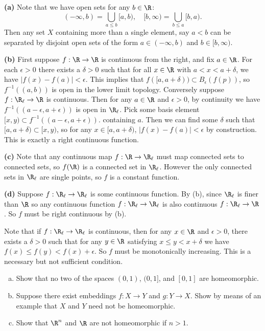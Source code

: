 \documentclass[11pt,letterpaper]{article}
\begin{document}
\begin{solution}
    \textbf{(a)} Note that we have open sets for any $b\in \R$: 
    \[
        (-\infty, b)=\bigcup_{a\leq b}[a,b),\quad [b,\infty)=\bigcup_{b\leq a}[b,a)
    .\] 
    Then any set $X$ containing more than a single element, say $a< b$ can be separated by disjoint open sets of the form $a\in(-\infty,b)$ and $b\in [b,\infty)$.
    
    \textbf{(b)} First suppose $f : \R \to \R$ is continuous from the right, and fix $a\in \R$. For each $\epsilon>0$ there exists a $\delta> 0$ such that for all $x\in \R$ with $a < x < a+\delta$, we have $|f(x)-f(a)|< \epsilon$. This implies that $f([a, a+\delta)) \subset B_\epsilon(f(p))$, so $f^{-1}((a,b))$ is open in the lower limit topology. Conversely suppose $f : \R_\ell \to \R$ is continuous. Then for any $a\in \R$ and $\epsilon > 0$, by continuity we have $f^{-1}((a - \epsilon, a + \epsilon))$ is open in $\R_\ell$. Pick some basis element $[x, y)\subset f^{-1}((a-\epsilon, a+\epsilon))$. containing $a$. Then we can find some $\delta$ such that $[a,a+\delta)\subset [x,y)$, so for any $x\in [a,a+\delta)$, $|f(x)-f(a)| < \epsilon$ by construction. This is exactly a right continuous function.        
    
    \textbf{(c)} Note that any continuous map $f : \R \to \R_\ell$ must map connected sets to connected sets, so $f(\R)$ is a connected set in $\R_\ell$. However the only connected sets in $\R_\ell$ are single points, so $f$ is a constant function.
    
    \textbf{(d)} Suppose $f : \R_\ell \to \R_\ell$ is some continuous function. By (b), since $\R_\ell$ is finer than $\R$ so any continuous function $f : \R_\ell \to \R_\ell$ is also continuous $f : \R_\ell \to \R$. So $f$ must be right continuous by (b).

    Note that if $f : \R_\ell \to \R_\ell$ is continuous, then  for any $x\in \R$ and $\epsilon > 0$, there exists a $\delta > 0$ such that for any $y\in \R$ satisfying $x\leq y<x+\delta$ we have $f(x)\leq f(y)<f(x)+\epsilon$. So $f$ must be monotonically increasing. This is a necessary but not sufficient condition.
\end{solution}

\begin{problem}\noindent
    \begin{enumerate}[(a)]
        \item Show that no two of the spaces $(0, 1)$, $(0, 1]$, and $[0, 1]$ are homeomorphic.
        \item Suppose there exist embeddings $f : X \to Y$ and $g : Y \to X$. Show by means of an example that $X$ and $Y$ need not be homeomorphic.
        \item Show that $\R^n$ and $\R$ are not homeomorphic if $n>1$.  
    \end{enumerate}
\end{problem}
\end{document}
